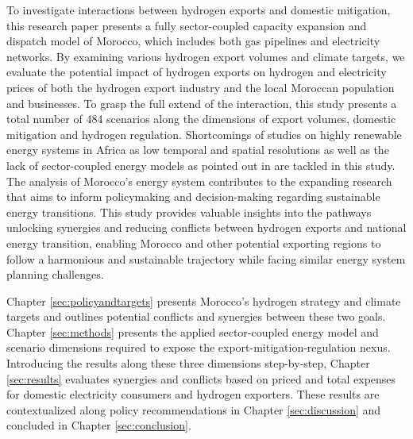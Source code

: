 To investigate interactions between hydrogen exports and domestic mitigation, this research paper presents a fully sector-coupled capacity expansion and dispatch model of Morocco, which includes both gas pipelines and electricity networks.
By examining various hydrogen export volumes and climate targets, we evaluate the potential impact of hydrogen exports on hydrogen and electricity prices of both the hydrogen export industry and the local Moroccan population and businesses.
To grasp the full extend of the interaction, this study presents a total number of 484 scenarios along the dimensions of export volumes, domestic mitigation and hydrogen regulation. Shortcomings of studies on highly renewable energy systems in Africa as low temporal and spatial resolutions as well as the lack of sector-coupled energy models as pointed out in \cite{Oyewo2023} are tackled in this study. The analysis of Morocco's energy system contributes to the expanding research that aims to inform policymaking and decision-making regarding sustainable energy transitions. This study provides valuable insights into the pathways unlocking synergies and reducing conflicts between hydrogen exports and national energy transition, enabling Morocco and other potential exporting regions to follow a harmonious and sustainable trajectory while facing similar energy system planning challenges.

Chapter \ref{sec:policyandtargets} presents Morocco's hydrogen strategy and climate targets and outlines potential conflicts and synergies between these two goals. Chapter \ref{sec:methods} presents the applied sector-coupled energy model and scenario dimensions required to expose the export-mitigation-regulation nexus. Introducing the results along these three dimensions step-by-step, Chapter \ref{sec:results} evaluates synergies and conflicts based on priced and total expenses for domestic electricity consumers and hydrogen exporters. These results are contextualized along policy recommendations in Chapter \ref{sec:discussion} and concluded in Chapter \ref{sec:conclusion}.



